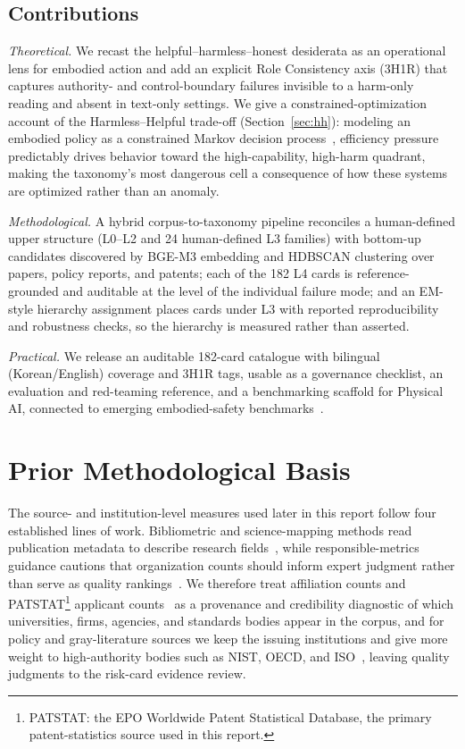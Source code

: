 \documentclass[11pt]{article}
\begin{document}
\subsection*{Contributions}

\textit{Theoretical.} We recast the helpful--harmless--honest desiderata as an operational lens for embodied action and add an explicit Role Consistency axis (3H1R) that captures authority- and control-boundary failures invisible to a harm-only reading and absent in text-only settings. We give a constrained-optimization account of the Harmless--Helpful trade-off (Section~\ref{sec:hh}): modeling an embodied policy as a constrained Markov decision process~\cite{altman1999,achiam2017}, efficiency pressure predictably drives behavior toward the high-capability, high-harm quadrant, making the taxonomy's most dangerous cell a consequence of how these systems are optimized rather than an anomaly.

\textit{Methodological.} A hybrid corpus-to-taxonomy pipeline reconciles a human-defined upper structure (L0--L2 and 24 human-defined L3 families) with bottom-up candidates discovered by BGE-M3 embedding and HDBSCAN clustering over papers, policy reports, and patents; each of the 182 L4 cards is reference-grounded and auditable at the level of the individual failure mode; and an EM-style hierarchy assignment places cards under L3 with reported reproducibility and robustness checks, so the hierarchy is measured rather than asserted.

\textit{Practical.} We release an auditable 182-card catalogue with bilingual (Korean/English) coverage and 3H1R tags, usable as a governance checklist, an evaluation and red-teaming reference, and a benchmarking scaffold for Physical AI, connected to emerging embodied-safety benchmarks~\cite{sermanet-asimov,asimov2}.

\section{Prior Methodological Basis}

The source- and institution-level measures used later in this report follow four established lines of work. Bibliometric and science-mapping methods read publication metadata to describe research fields~\cite{zupic2015,vaneck2010,aria2017}, while responsible-metrics guidance cautions that organization counts should inform expert judgment rather than serve as quality rankings~\cite{hicks2015}. We therefore treat affiliation counts and PATSTAT\footnote{PATSTAT: the EPO Worldwide Patent Statistical Database, the primary patent-statistics source used in this report.} applicant counts~\cite{oecd2009patent,oecd-ipstats} as a provenance and credibility diagnostic of which universities, firms, agencies, and standards bodies appear in the corpus, and for policy and gray-literature sources we keep the issuing institutions and give more weight to high-authority bodies such as NIST, OECD, and ISO~\cite{aacods,tricco2018}, leaving quality judgments to the risk-card evidence review.
\end{document}
